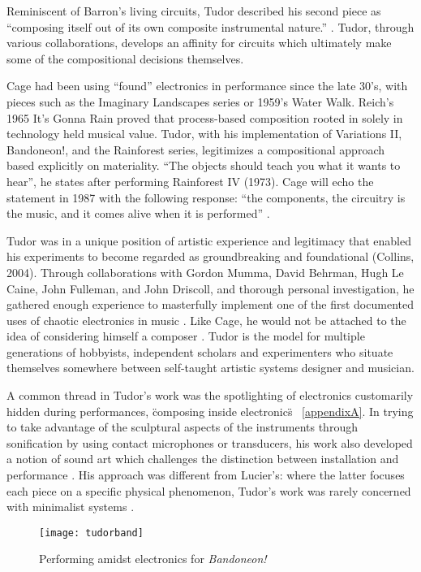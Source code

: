 \begin{itemize}
Reminiscent of Barron’s living circuits, Tudor described his second piece as “composing itself out of its own composite instrumental nature.”  \cite{tudor,kuivila2004}. Tudor, through various collaborations, develops an affinity for circuits which ultimately make some of the compositional decisions themselves. 

Cage had been using “found” electronics in performance since the late 30’s, with pieces such as the Imaginary Landscapes series or 1959’s Water Walk. Reich’s 1965 It’s Gonna Rain proved that process-based composition rooted in solely in technology held musical value. Tudor, with his implementation of Variations II, Bandoneon!, and the Rainforest series, legitimizes a compositional approach based explicitly on materiality. “The objects should teach you what it wants to hear”, he states after performing Rainforest IV (1973). Cage will echo the statement in 1987 with the following response: “the components, the circuitry is the music, and it comes alive when it is performed” \cite{nakai2014}. 

Tudor was in a unique position of artistic experience and legitimacy that enabled his experiments to become regarded as groundbreaking and foundational (Collins, 2004). Through collaborations with Gordon Mumma, David Behrman, Hugh Le Caine, John Fulleman, and John Driscoll, and thorough personal investigation, he gathered enough experience to masterfully implement one of the first documented uses of chaotic electronics in music \cite{kuivila2004}.  Like Cage, he would not be attached to the idea of considering himself a composer \cite{kuivila1998}. Tudor is the model for multiple generations of hobbyists, independent scholars and experimenters who situate themselves somewhere between self-taught artistic systems designer and musician. 

A common thread in Tudor’s work was the spotlighting of electronics customarily hidden during performances, \"composing inside electronics\" ~\ref{appendixA}. In trying to take advantage of the sculptural aspects of the instruments through sonification by using contact microphones or transducers, his work also developed a notion of sound art which challenges the distinction between installation and performance \cite{driscoll2004}. His approach was different from Lucier’s: where the latter focuses each piece on a specific physical phenomenon, Tudor’s work was rarely concerned with minimalist systems \cite{collins2004,driscoll2004}. 

	\begin{figure}[h!]
	  \caption{Performing amidst electronics for \emph{Bandoneon!}}
	  \centering
	    \texttt{[image: tudorband]}
	\end{figure}


\end{itemize}
